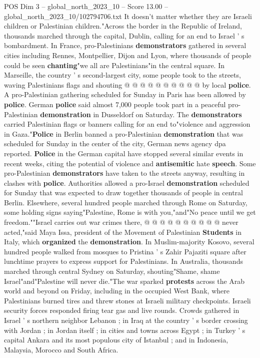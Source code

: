 \begin{textsample}{POS Dim 3 – global\_north\_2023\_10 – Score 13.00 – global\_north\_2023\_10/102794706.txt}
It doesn't matter whether they are Israeli children or Palestinian children."Across the border in the Republic of Ireland, thousands marched through the capital, Dublin, calling for an end to Israel ' s bombardment.
In France, pro-Palestinians \textbf{demonstrators} gathered in several cities including Rennes, Montpellier, Dijon and Lyon, where thousands of people could be seen \textbf{chanting}"we all are Palestinians"in the central square.
In Marseille, the country ' s second-largest city, some people took to the streets, waving Palestinians flags and shouting @ @ @ @ @ @ @ @ @ @ by local \textbf{police}.
A pro-Palestinian gathering scheduled for Sunday in Paris has been allowed by \textbf{police}.
German \textbf{police} said almost 7,000 people took part in a peaceful pro-Palestinian \textbf{demonstration} in Dusseldorf on Saturday.
The \textbf{demonstrators} carried Palestinian flags or banners calling for an end to"violence and aggression in Gaza."\textbf{Police} in Berlin banned a pro-Palestinian \textbf{demonstration} that was scheduled for Sunday in the center of the city, German news agency dpa reported. \textbf{Police} in the German capital have stopped several similar events in recent weeks, citing the potential of violence and \textbf{antisemitic} hate \textbf{speech}.
Some pro-Palestinian \textbf{demonstrators} have taken to the streets anyway, resulting in clashes with \textbf{police}.
Authorities allowed a pro-Israel \textbf{demonstration} scheduled for Sunday that was expected to draw together thousands of people in central Berlin.
Elsewhere, several hundred people marched through Rome on Saturday, some holding signs saying"Palestine, Rome is with you,"and"No peace until we get freedom.""Israel carries out war crimes there, @ @ @ @ @ @ @ @ @ @ never acted,"said Maya Issa, president of the Movement of Palestinian \textbf{Students} in Italy, which \textbf{organized} the \textbf{demonstration}.
In Muslim-majority Kosovo, several hundred people walked from mosques to Pristina ' s Zahir Pajaziti square after lunchtime prayers to express support for Palestinians.
In Australia, thousands marched through central Sydney on Saturday, shouting"Shame, shame Israel"and"Palestine will never die."The war sparked \textbf{protests} across the Arab world and beyond on Friday, including in the occupied West Bank, where Palestinians burned tires and threw stones at Israeli military checkpoints.
Israeli security forces responded firing tear gas and live rounds.
Crowds gathered in Israel ' s northern neighbor Lebanon ; in Iraq at the country ' s border crossing with Jordan ; in Jordan itself ; in cities and towns across Egypt ; in Turkey ' s capital Ankara and its most populous city of Istanbul ; and in Indonesia, Malaysia, Morocco and South Africa.

\end{textsample}
